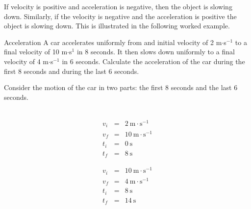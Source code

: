 If velocity is positive and acceleration is negative, then the object is slowing down. Similarly, if the velocity is negative and the acceleration is positive the object is slowing down. This is illustrated in the following worked example.\par 
\begin{wex}{Acceleration}
{A car accelerates uniformly from and initial velocity of 2 m$\cdot$s$^{-1}$ to a final velocity of 10 m$\cdot$s$^1$ in 8 seconds. It then slows down uniformly to a final velocity of 4 m$\cdot$s$^{-1}$ in 6 seconds. Calculate the acceleration of the car during the first 8 seconds and during the last 6 seconds.}
{
Consider the motion of the car in two parts: the first 8 seconds and the last 6 seconds.\\
\\
\begin{minipage}{0.5\textwidth}
\begin{eqnarray*}
v_i &=& 2~\text{m}\cdot \text{s}^{-1}\\
v_f &=& 10~\text{m}\cdot \text{s}^{-1}\\
t_i &=& 0~\text{s}\\
t_f &=& 8~\text{s}
\end{eqnarray*}
\end{minipage}
\begin{minipage}{0.5\textwidth}
\begin{eqnarray*}
v_i &=& 10~\text{m}\cdot \text{s}^{-1}\\
v_f &=& 4~\text{m}\cdot \text{s}^{-1}\\
t_i &=& 8~\text{s}\\
t_f &=& 14~\text{s}
\end{eqnarray*}
\end{minipage}\\

}
\end{wex}
